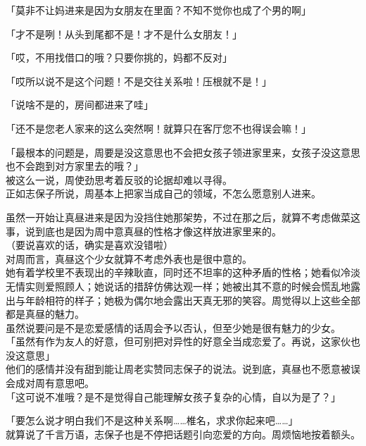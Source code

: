 「莫非不让妈进来是因为女朋友在里面？不知不觉你也成了个男的啊」

「才不是咧！从头到尾都不是！才不是什么女朋友！」

「哎，不用找借口的哦？只要你挑的，妈都不反对」

「哎所以说不是这个问题！不是交往关系啦！压根就不是！」

「说啥不是的，房间都进来了哇」

「还不是您老人家来的这么突然啊！就算只在客厅您不也得误会嘛！」

「最根本的问题是，周要是没这意思也不会把女孩子领进家里来，女孩子没这意思也不会跑到对方家里去的哦？」\\

被这么一说，周使劲思考着反驳的论据却难以寻得。\\

正如志保子所说，周基本上把家当成自己的领域，不怎么愿意别人进来。

虽然一开始让真昼进来是因为没挡住她那架势，不过在那之后，就算不考虑做菜这事，说到底也是因为周中意真昼的性格才像这样放进家里来的。\\

（要说喜欢的话，确实是喜欢没错啦）\\

对周而言，真昼这个少女就算不考虑外表也是很中意的。\\

她有着学校里不表现出的辛辣耿直，同时还不坦率的这种矛盾的性格；她看似冷淡无情实则爱照顾人；她说话的措辞仿佛达观一样；她被出其不意的时候会慌乱地露出与年龄相符的样子；她极为偶尔地会露出天真无邪的笑容。周觉得以上这些全部都是真昼的魅力。\\

虽然说要问是不是恋爱感情的话周会予以否认，但至少她是很有魅力的少女。\\

「虽然有作为友人的好意，但可别把对异性的好意全当成恋爱了。再说，这家伙也没这意思」\\

他们的感情并没有甜到能让周老实赞同志保子的说法。说到底，真昼也不愿意被误会成对周有意思吧。\\

「这可说不准哦？是不是觉得自己能理解女孩子复杂的心情，自以为是了？」

「要怎么说才明白我们不是这种关系啊……椎名，求求你起来吧……」\\

就算说了千言万语，志保子也是不停把话题引向恋爱的方向。周烦恼地按着额头。

